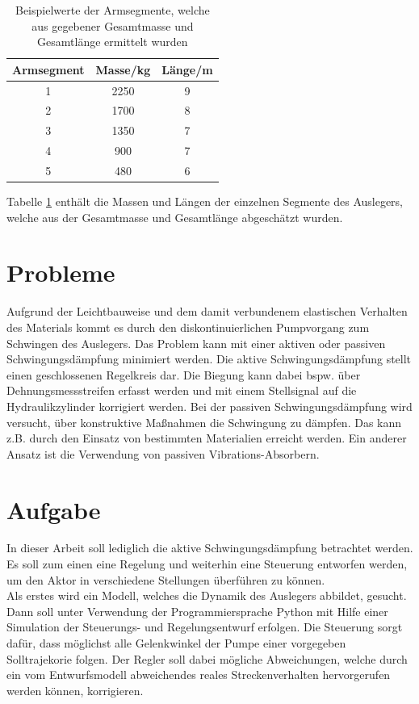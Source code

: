 \begin{table}[h!]
\caption{Beispielwerte der Armsegmente, welche aus gegebener Gesamtmasse und Gesamtlänge ermittelt wurden}
\label{tab:WertePumpe}
\centering
\begin{tabular}{c|c|c}
\rule[-1ex]{0pt}{2.5ex} Armsegment & Masse/kg & Länge/m \\ 
\hline \rule[-1ex]{0pt}{2.5ex} 1 & 2250 & 9 \\ 
\rule[-1ex]{0pt}{2.5ex} 2 & 1700 & 8 \\ 
\rule[-1ex]{0pt}{2.5ex} 3 & 1350 & 7 \\ 
\rule[-1ex]{0pt}{2.5ex} 4 & 900 & 7 \\ 
\rule[-1ex]{0pt}{2.5ex} 5 & 480 & 6 \\ 
\end{tabular} 
\end{table}

Tabelle \ref{tab:WertePumpe} enthält die Massen und Längen der einzelnen Segmente des Auslegers, welche aus der Gesamtmasse und Gesamtlänge abgeschätzt wurden.

\section{Probleme}
Aufgrund der Leichtbauweise und dem damit verbundenem elastischen Verhalten des Materials kommt es durch den diskontinuierlichen Pumpvorgang zum Schwingen des Auslegers. Das Problem kann mit einer aktiven oder passiven Schwingungsdämpfung minimiert werden. Die aktive Schwingungsdämpfung stellt einen geschlossenen Regelkreis dar. Die Biegung kann dabei bspw. über Dehnungsmessstreifen erfasst werden und mit einem Stellsignal auf die Hydraulikzylinder korrigiert werden. Bei der passiven Schwingungsdämpfung wird versucht, über konstruktive Maßnahmen die Schwingung zu dämpfen. Das kann z.B. durch den Einsatz von bestimmten Materialien erreicht werden. Ein anderer Ansatz ist die Verwendung von passiven Vibrations-Absorbern. 

\section{Aufgabe}
In dieser Arbeit soll lediglich die aktive Schwingungsdämpfung betrachtet werden. Es soll zum einen eine Regelung und weiterhin eine Steuerung entworfen werden, um den Aktor in verschiedene Stellungen überführen zu können. \\
Als erstes wird ein Modell, welches die Dynamik des Auslegers abbildet, gesucht. Dann soll unter Verwendung der Programmiersprache Python mit Hilfe einer Simulation der Steuerungs- und Regelungsentwurf erfolgen. Die Steuerung sorgt dafür, dass möglichst alle Gelenkwinkel der Pumpe einer vorgegeben Solltrajekorie folgen. Der Regler soll dabei mögliche Abweichungen, welche durch ein vom Entwurfsmodell abweichendes reales Streckenverhalten hervorgerufen werden können, korrigieren. 


